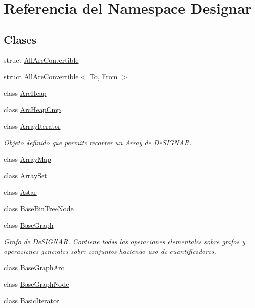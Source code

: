 \hypertarget{namespace_designar}{}\section{Referencia del Namespace Designar}
\label{namespace_designar}
\subsection*{Clases}
\begin{DoxyCompactItemize}
\item 
struct \hyperlink{struct_designar_1_1_all_are_convertible}{All\+Are\+Convertible}
\item 
struct \hyperlink{struct_designar_1_1_all_are_convertible_3_01_to_00_01_from_01_4}{All\+Are\+Convertible$<$ To, From $>$}
\item 
class \hyperlink{class_designar_1_1_arc_heap}{Arc\+Heap}
\item 
class \hyperlink{class_designar_1_1_arc_heap_cmp}{Arc\+Heap\+Cmp}
\item 
class \hyperlink{class_designar_1_1_array_iterator}{Array\+Iterator}
\begin{DoxyCompactList}\small\item\em Objeto definido que permite recorrer un Array de De\+S\+I\+G\+N\+AR. \end{DoxyCompactList}\item 
class \hyperlink{class_designar_1_1_array_map}{Array\+Map}
\item 
class \hyperlink{class_designar_1_1_array_set}{Array\+Set}
\item 
class \hyperlink{class_designar_1_1_astar}{Astar}
\item 
class \hyperlink{class_designar_1_1_base_bin_tree_node}{Base\+Bin\+Tree\+Node}
\item 
class \hyperlink{class_designar_1_1_base_graph}{Base\+Graph}
\begin{DoxyCompactList}\small\item\em Grafo de De\+S\+I\+G\+N\+AR. Contiene todas las operaciones elementales sobre grafos y operaciones generales sobre conjuntos haciendo uso de cuantificadores. \end{DoxyCompactList}\item 
class \hyperlink{class_designar_1_1_base_graph_arc}{Base\+Graph\+Arc}
\item 
class \hyperlink{class_designar_1_1_base_graph_node}{Base\+Graph\+Node}
\item 
class \hyperlink{class_designar_1_1_basic_iterator}{Basic\+Iterator}

\end{DoxyCompactItemize}
